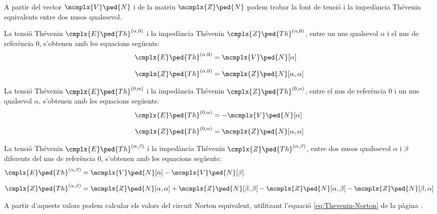 A partir del vector $\mcmplx{V}\ped{N}$ i de la matriu
$\mcmplx{Z}\ped{N}$ podem trobar la font de tensió i la impedància
Thévenin equivalents entre dos nusos qualssevol.

La tensió Thévenin $\cmplx{E}\ped{Th}^{(\alpha,0)}$ i la impedància
Thévenin $\cmplx{Z}\ped{Th}^{(\alpha,0)}$, entre  un nus qualsevol
$\alpha$ i el nus de referència 0, s'obtenen amb les equacions
següents:
\begin{align}
    \cmplx{E}\ped{Th}^{(\alpha,0)} &= \mcmplx{V}\ped{N}[\alpha] \\[2mm]
    \cmplx{Z}\ped{Th}^{(\alpha,0)} &= \mcmplx{Z}\ped{N}[\alpha,\alpha]
\end{align}

La tensió Thévenin $\cmplx{E}\ped{Th}^{(0,\alpha)}$ i la impedància
Thévenin $\cmplx{Z}\ped{Th}^{(0,\alpha)}$, entre  el nus de referència 0 i un nus qualsevol
$\alpha$, s'obtenen amb les equacions
següents:
\begin{align}
    \cmplx{E}\ped{Th}^{(0,\alpha)} &= -\mcmplx{V}\ped{N}[\alpha] \\[2mm]
    \cmplx{Z}\ped{Th}^{(0,\alpha)} &= \mcmplx{Z}\ped{N}[\alpha,\alpha]
\end{align}

La tensió Thévenin $\cmplx{E}\ped{Th}^{(\alpha,\beta)}$ i la
impedància Thévenin $\cmplx{Z}\ped{Th}^{(\alpha,\beta)}$, entre dos
nusos qualssevol $\alpha$ i $\beta$ diferents del nus de referència 0, s'obtenen amb les equacions
següents:
\begin{align}
    \cmplx{E}\ped{Th}^{(\alpha,\beta)} &= \mcmplx{V}\ped{N}[\alpha] - \mcmplx{V}\ped{N}[\beta] \\[2mm]
    \cmplx{Z}\ped{Th}^{(\alpha,\beta)} &= \mcmplx{Z}\ped{N}[\alpha,\alpha] +
    \mcmplx{Z}\ped{N}[\beta,\beta] - \mcmplx{Z}\ped{N}[\alpha,\beta] -
    \mcmplx{Z}\ped{N}[\beta,\alpha]
\end{align}

A partir d'aquests valors podem calcular els valors del circuit Norton equivalent, utilitzant l'equació \eqref{eq:Thevenin-Norton} de la pàgina \pageref{eq:Thevenin-Norton}.


